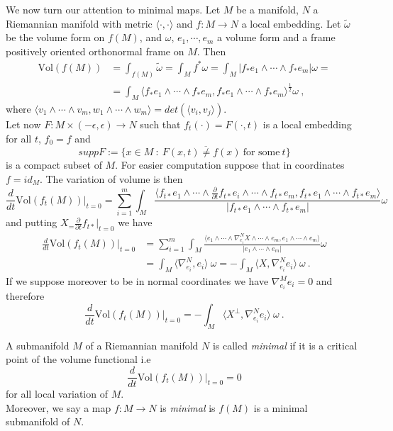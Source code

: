 We now turn our attention to minimal maps.
Let $M$ be a manifold, $N$ a Riemannian manifold with metric $\langle \cdot, \cdot \rangle$ and $f:M \to N$ a local embedding. Let $\widetilde{\omega}$ be the volume form on $f(M)$, and $\omega$, $e_1, \cdots , e_m$ a volume form and a frame positively oriented orthonormal frame on $M$. Then
\[
\begin{split}
    \text{Vol}(f(M)) & = \int_{f(M)} \widetilde{\omega} = \int_M f^* \omega  = \int_M | f_* e_1 \wedge \cdots \wedge f_* e_m | \omega = \\
    & = \int_M \langle f_* e_1 \wedge \cdots \wedge f_* e_m ,f_* e_1 \wedge \cdots \wedge f_* e_m \rangle ^{\frac{1}{2}} \omega \ ,
\end{split}
\]
where $\langle v_1 \wedge \cdots \wedge v_m , w_1 \wedge \cdots \wedge w_m \rangle = det(\langle v_i,v_j \rangle)$.\\
Let now $F: M \times (-\epsilon, \epsilon) \to N$ such that $f_t(\cdot) = F(\cdot,t)$ is a local embedding for all $t$, $f_0 = f$ and
\[ supp F:= \overline{ \{ x\in M \ :\ F(x,t) \neq f(x) \ \text{for some} \ t\} }  \]
is a compact subset of $M$. For easier computation suppose that in coordinates $f = id_M$. The variation of volume is then
\[
    \frac{d}{dt} \text{Vol}(f_t(M)) \Big|_{t=0} = \sum_{i=1}^m \int_M \frac{ \langle f_{t*} e_1 \wedge \cdots \wedge \frac{\partial}{\partial t} f_{t*} e_i \wedge \cdots \wedge f_{t*} e_m ,f_{t*} e_1 \wedge \cdots \wedge f_{t*} e_m \rangle }{| f_{t*} e_1 \wedge \cdots \wedge f_{t*} e_m |} \omega
\]
and putting $X_=\frac{\partial}{\partial t} f_{t*} |_{t=0} $ we have
\[
\begin{split}
    \frac{d}{dt} \text{Vol}(f_t(M)) \Big|_{t=0} & = \sum_{i=1}^m \int_M \frac{ \langle e_1 \wedge \cdots \wedge \nabla^N_{e_i} X \wedge \cdots \wedge e_m , e_1 \wedge \cdots \wedge e_m \rangle }{| e_1 \wedge \cdots \wedge e_m |} \omega \\
    & = \int_M \langle \nabla^N_{e_i}, e_i \rangle \ \omega = - \int_M \langle X, \nabla^N_{e_i} e_i \rangle \ \omega \ .
\end{split}
\]
If we suppose moreover to be in normal coordinates we have $\nabla^M_{e_i} e_i = 0$ and therefore
\[
   \frac{d}{dt} \text{Vol}(f_t(M)) \Big|_{t=0}  = - \int_M \langle X^\perp, \nabla^N_{e_i} e_i \rangle \ \omega \ . 
\]
\begin{definition}
    A submanifold $M$ of a Riemannian manifold $N$ is called \textit{minimal} if it is a critical point of the volume functional i.e
    \[
        \frac{d}{dt} \text{Vol}(f_t(M)) \Big|_{t=0}  = 0
    \]
    for all local variation of $M$.\\
    Moreover, we say a map $f:M \to N$ is \textit{minimal} is $f(M)$ is a minimal submanifold of $N$.
\end{definition}
